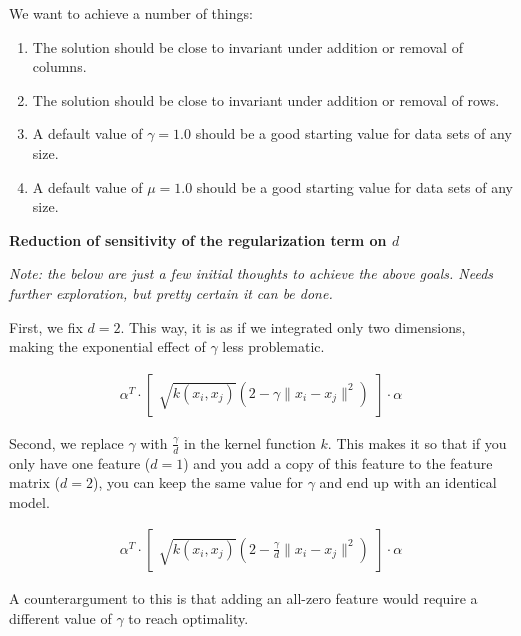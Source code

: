\documentclass[12pt]{article}
\begin{document}
We want to achieve a number of things:

\begin{enumerate}
\item The solution should be close to invariant under addition or removal of columns.
\item The solution should be close to invariant under addition or removal of rows.
\item A default value of $\gamma = 1.0$ should be a good starting value for data sets of any size.
\item A default value of $\mu = 1.0$ should be a good starting value for data sets of any size.
\end{enumerate}

\textbf{Reduction of sensitivity of the regularization term on $d$}

\textit{Note: the below are just a few initial thoughts to achieve the above goals. Needs further exploration, but pretty certain it can be done.}

First, we fix $d=2$. This way, it is as if we integrated only two dimensions, making the exponential effect of $\gamma$ less problematic.

\begin{align}
\alpha^T \cdot \begin{bmatrix} \sqrt{k(x_i,x_j)} \left( 2 - \gamma\|x_i - x_j\|^2\right) \end{bmatrix} \cdot \alpha
\end{align}

Second, we replace $\gamma$ with $\frac{\gamma}{d}$ in the kernel function $k$. This makes it so that if you only have one feature ($d=1$) and you add a copy of this feature to the feature matrix ($d=2$), you can keep the same value for $\gamma$ and end up with an identical model.

\begin{align}
\alpha^T \cdot \begin{bmatrix} \sqrt{k(x_i,x_j)} \left( 2 - \frac{\gamma}{d}\|x_i - x_j\|^2\right) \end{bmatrix} \cdot \alpha
\end{align}

A counterargument to this is that adding an all-zero feature would require a different value of $\gamma$ to reach optimality.
\end{document}
